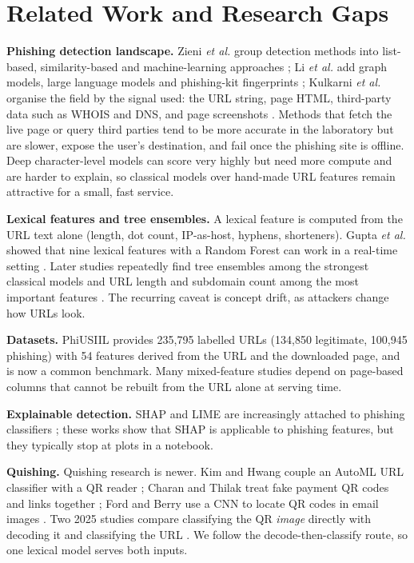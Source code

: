 \documentclass[conference]{IEEEtran}
\begin{document}
\section{Related Work and Research Gaps}
\textbf{Phishing detection landscape.} Zieni \textit{et al.} group detection methods into list-based, similarity-based and machine-learning approaches \cite{zieni}; Li \textit{et al.} add graph models, large language models and phishing-kit fingerprints \cite{li}; Kulkarni \textit{et al.} organise the field by the signal used: the URL string, page HTML, third-party data such as WHOIS and DNS, and page screenshots \cite{kulkarni}. Methods that fetch the live page or query third parties tend to be more accurate in the laboratory but are slower, expose the user's destination, and fail once the phishing site is offline. Deep character-level models can score very highly \cite{catal,kritika} but need more compute and are harder to explain, so classical models over hand-made URL features remain attractive for a small, fast service.

\textbf{Lexical features and tree ensembles.} A lexical feature is computed from the URL text alone (length, dot count, IP-as-host, hyphens, shorteners). Gupta \textit{et al.} showed that nine lexical features with a Random Forest can work in a real-time setting \cite{gupta}. Later studies repeatedly find tree ensembles among the strongest classical models and URL length and subdomain count among the most important features \cite{calzarossa,kustiawan,bishtawi,prakongsin}. The recurring caveat is concept drift, as attackers change how URLs look.

\textbf{Datasets.} PhiUSIIL \cite{phiusiil} provides 235{,}795 labelled URLs (134{,}850 legitimate, 100{,}945 phishing) with 54 features derived from the URL and the downloaded page, and is now a common benchmark. Many mixed-feature studies depend on page-based columns that cannot be rebuilt from the URL alone at serving time.

\textbf{Explainable detection.} SHAP and LIME are increasingly attached to phishing classifiers \cite{pavani,e2phish,poddar,armoush,kehkashan}; these works show that SHAP is applicable to phishing features, but they typically stop at plots in a notebook.

\textbf{Quishing.} Quishing research is newer. Kim and Hwang couple an AutoML URL classifier with a QR reader \cite{hwang}; Charan and Thilak treat fake payment QR codes and links together \cite{charan}; Ford and Berry use a CNN to locate QR codes in email images \cite{ford}. Two 2025 studies compare classifying the QR \emph{image} directly with decoding it and classifying the URL \cite{trad,cyberai}. We follow the decode-then-classify route, so one lexical model serves both inputs.
\end{document}
